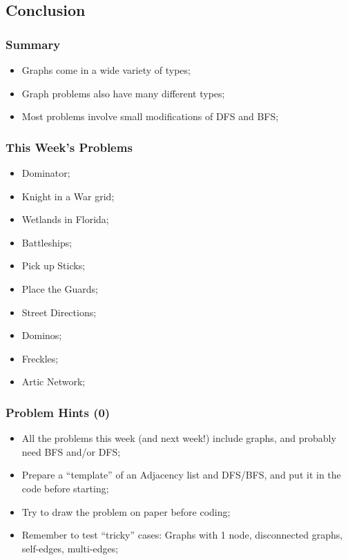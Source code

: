 \documentclass{beamer}
\begin{document}
\subsection{Conclusion}
\begin{frame}
  \frametitle{Summary}
  \begin{itemize}
  \item Graphs come in a wide variety of types;
  \item Graph problems also have many different types;
  \item Most problems involve small modifications of DFS and BFS;
  \end{itemize}
\end{frame}

\begin{frame}
  \frametitle{This Week's Problems}
  \begin{itemize}
  \item Dominator;
  \item Knight in a War grid;
  \item Wetlands in Florida;
  \item Battleships;
  \item Pick up Sticks;
  \item Place the Guards;
  \item Street Directions;
  \item Dominos;
  \item Freckles;
  \item Artic Network;
  \end{itemize}
\end{frame}

\begin{frame}
  \frametitle{Problem Hints (0)}
  \begin{itemize}
  \item All the problems this week (and next week!) include graphs,
    and probably need BFS and/or DFS;

    \medskip

  \item Prepare a ``template'' of an Adjacency list and DFS/BFS, and
    put it in the code before starting;

    \medskip

  \item Try to draw the problem on paper before coding;

    \medskip

  \item Remember to test ``tricky'' cases: Graphs with 1 node,
    disconnected graphs, self-edges, multi-edges;
  \end{itemize}
\end{frame}
\end{document}
